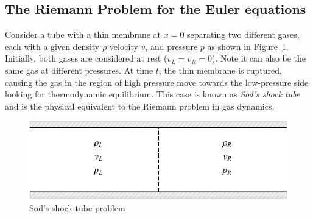 \subsection{The Riemann Problem for the Euler equations}
Consider a tube with a thin membrane at $x=0$ separating two different gases, each with a given density $\rho$ velocity $v$, and pressure $p$ as shown in Figure~\ref{fig:shocktube}.  Initially, both gases are considered at rest ($v_L=v_R=0$). Note it can also be the same gas at different pressures. At time $t$, the thin membrane is ruptured, causing the gas in the region of high pressure move towards the low-pressure side looking for thermodynamic equilibrium. This case is known as \textit{Sod's shock tube} and is the physical equivalent to the Riemann problem in gas dynamics.
\begin{figure}[htbp]
	\centering
	\includegraphics[width=0.6\linewidth]{Pictures/sod_shock_tube}
	\caption{Sod's shock-tube problem}
	\label{fig:shocktube}
\end{figure}

